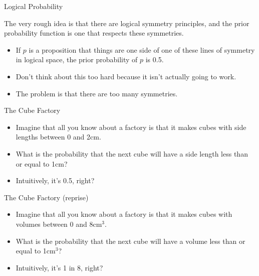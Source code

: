 \documentclass[
  ignorenonframetext,
]{beamer}
\providecommand{\tightlist}{%
  \setlength{\itemsep}{0pt}\setlength{\parskip}{0pt}}
\renewcommand{\,}{\text{, }}
\begin{document}
\begin{frame}{Logical Probability}
\protect\hypertarget{logical-probability}{}

The very rough idea is that there are logical symmetry principles, and
the prior probability function is one that respects these symmetries.

\begin{itemize}
\tightlist
\item
  If \(p\) is a proposition that things are one side of one of these
  lines of symmetry in logical space, the prior probability of \(p\) is
  0.5. \pause
\item
  Don't think about this too hard because it isn't actually going to
  work.
\item
  The problem is that there are too many symmetries.
\end{itemize}

\end{frame}

\begin{frame}{The Cube Factory}
\protect\hypertarget{the-cube-factory}{}

\begin{itemize}
\tightlist
\item
  Imagine that all you know about a factory is that it makes cubes with
  side lengths between 0 and 2cm.
\item
  What is the probability that the next cube will have a side length
  less than or equal to 1cm? \pause
\item
  Intuitively, it's 0.5, right?
\end{itemize}

\end{frame}

\begin{frame}{The Cube Factory (reprise)}
\protect\hypertarget{the-cube-factory-reprise}{}

\begin{itemize}
\tightlist
\item
  Imagine that all you know about a factory is that it makes cubes with
  volumes between 0 and 8cm\(^3\).
\item
  What is the probability that the next cube will have a volume less
  than or equal to 1cm\(^3\)? \pause
\item
  Intuitively, it's 1 in 8, right?
\end{itemize}

\end{frame}
\end{document}
